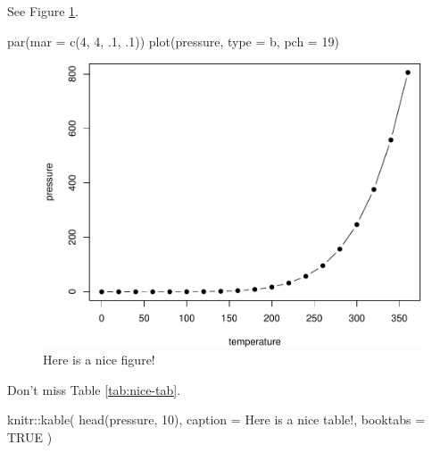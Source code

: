 \documentclass[12pt, oneside, openright]{byuthesis}
\newenvironment{Shaded}{\begin{snugshade}}{\end{snugshade}}
\newcommand{\AttributeTok}[1]{\textcolor[rgb]{0.77,0.63,0.00}{#1}}
\newcommand{\ConstantTok}[1]{\textcolor[rgb]{0.00,0.00,0.00}{#1}}
\newcommand{\DecValTok}[1]{\textcolor[rgb]{0.00,0.00,0.81}{#1}}
\newcommand{\FunctionTok}[1]{\textcolor[rgb]{0.00,0.00,0.00}{#1}}
\newcommand{\NormalTok}[1]{#1}
\newcommand{\SpecialCharTok}[1]{\textcolor[rgb]{0.00,0.00,0.00}{#1}}
\newcommand{\StringTok}[1]{\textcolor[rgb]{0.31,0.60,0.02}{#1}}
\begin{document}
See Figure \ref{fig:nice-fig}.

\begin{Shaded}
\begin{Highlighting}[]
\FunctionTok{par}\NormalTok{(}\AttributeTok{mar =} \FunctionTok{c}\NormalTok{(}\DecValTok{4}\NormalTok{, }\DecValTok{4}\NormalTok{, .}\DecValTok{1}\NormalTok{, .}\DecValTok{1}\NormalTok{))}
\FunctionTok{plot}\NormalTok{(pressure, }\AttributeTok{type =} \StringTok{\textquotesingle{}b\textquotesingle{}}\NormalTok{, }\AttributeTok{pch =} \DecValTok{19}\NormalTok{)}
\end{Highlighting}
\end{Shaded}

\begin{figure}

{\centering \includegraphics[width=0.8\linewidth]{thesis_files/figure-latex/nice-fig-1} 

}

\caption{Here is a nice figure!}\label{fig:nice-fig}
\end{figure}

Don't miss Table \ref{tab:nice-tab}.

\begin{Shaded}
\begin{Highlighting}[]
\NormalTok{knitr}\SpecialCharTok{::}\FunctionTok{kable}\NormalTok{(}
  \FunctionTok{head}\NormalTok{(pressure, }\DecValTok{10}\NormalTok{), }\AttributeTok{caption =} \StringTok{\textquotesingle{}Here is a nice table!\textquotesingle{}}\NormalTok{,}
  \AttributeTok{booktabs =} \ConstantTok{TRUE}
\NormalTok{)}
\end{Highlighting}
\end{Shaded}
\end{document}
